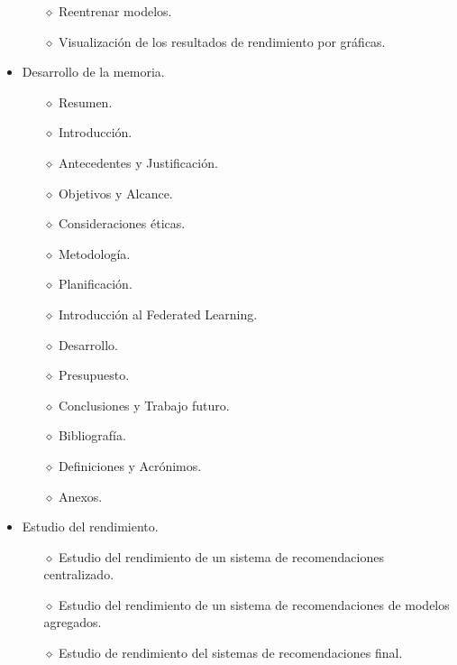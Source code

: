 \begin{itemize}
\begin{itemize}
            \item [$\diamond$]Reentrenar modelos.
            \item [$\diamond$]Visualización de los resultados de rendimiento por gráficas.
        \end{itemize}
    \item Desarrollo de la memoria.
        \begin{itemize}
            \item [$\diamond$]Resumen.
            \item [$\diamond$]Introducción.
            \item [$\diamond$]Antecedentes y Justificación.
            \item [$\diamond$]Objetivos y Alcance.
            \item [$\diamond$]Consideraciones éticas.
            \item [$\diamond$]Metodología.
            \item [$\diamond$]Planificación.
            \item [$\diamond$]Introducción al Federated Learning.
            \item [$\diamond$]Desarrollo.
            \item [$\diamond$]Presupuesto.
            \item [$\diamond$]Conclusiones y Trabajo futuro.
            \item [$\diamond$]Bibliografía.
            \item [$\diamond$]Definiciones y Acrónimos.
            \item [$\diamond$]Anexos.
        \end{itemize}
    \item Estudio del rendimiento.
        \begin{itemize}
            \item [$\diamond$]Estudio del rendimiento de un sistema de recomendaciones centralizado.
            \item [$\diamond$]Estudio del rendimiento de un sistema de recomendaciones de modelos agregados.
            \item [$\diamond$]Estudio de rendimiento del sistemas de recomendaciones final.
        \end{itemize}
\end{itemize}
\newpage
